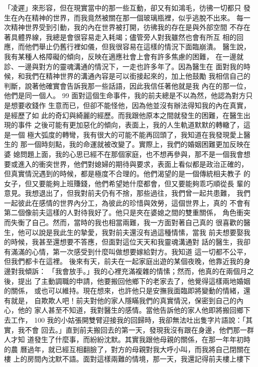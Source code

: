 「凌遲」來形容，但在現實當中的那一些互動，卻又有如鴻毛，彷彿一切都只
發生在內在精神的世界，而我竟然被關在那一個玻璃瓶裡，似乎逃脫不出來。
每一次精神世界受到引動，我的內在世界被打開，彷彿我的存在是與外部空間
不存在著具體界線，我總是會很容易走入耗竭；儘管旁人對我雖然也會有所互
相的回應，而他們舉止仍舊行裡如儀，但我很容易在這樣的情況下面臨崩潰。
醫生說，我有某種人格障礙的傾向，反映在適應社會上會有許多焦慮的困難，
在一邊就診、一邊與對方的靈魂溝通的情況下，一走也許多年了。因為醫生在
面對我的時候，和我們在精神世界的溝通內容是可以銜接起來的，加上他鼓勵
我相信自己的判斷，說著他確實會告訴我那一些話語，因此我信任著他就是我
內在的那一位，他們是同一個人。 
99 
面對這個生命事件，我的前夫總是不以為然，他認為對方只是想要收錢作
生意而已，但卻不能怪他，因為他並沒有辦法得知我的內在真實，是經歷了如
此的奇幻與綺麗的經歷。而我跟他原本之間就發生的困難，在醫生出現的事件
之後可能有更加惡化的傾向，表面上，我的人生軌道默默的轉轍了，這是一個
極大弧度的轉彎，我有很大的可能不能再回頭了，我知道在我發現愛上醫生的
那一個時刻點，我的命運就被改變了。實際上，我們的婚姻困難更加反映在婆
媳問題上面，我的心思已經不在那個家庭，也不想再參與，那不是一個我會想
要或進入的衝突世界，他們對媳婦的期待與要求，表面上看似都是政治正確的，
但真實情況遇到的時候，都是極度不合理的。他們渴望的是一個傳統相夫教子
的女子，但又要能夠上班賺錢，他們希望她什麼都會，但又要能夠乖巧順從長
輩的意見。我想退出了，但我對前夫仍有不捨，那些過往，我們曾一起共患難，
我們一起彼此在感情的世界內分工，為彼此的珍惜與效勞，這個世界上，真的
不會有第二個像前夫這樣的人對待我好了。他只是夾在婆媳之間的雙重關係，
角色衝突而失衡了自己。然而，當時的我也相當兩難，我一方面對著自己真的
很喜歡的醫生，他可以說是我此生的摯愛，我對前夫還沒有過這種情愫，當我
前夫想要娶我的時候，我甚至還想要不答應，但面對這位天天和我靈魂溝通對
話的醫生，我卻有滿滿的心情，第一次感受到什麼叫做想要嫁給對方。我知道
這一切都不公平，但我們都卡在這裡。  
後來有天，前夫在一起家庭出遊的某個夜晚，他靠近我的身邊對我傾訴：
「我會放手。」我的心裡充滿複雜的情愫；然而，他真的在兩個月之後，提出
了主動調職的申請，他要搬回他鄉下的老家去了，他覺得這樣兩地婚姻的關係，
或也可以維持。現在想來，也許他只是安撫我面臨即將變動的情緒，還有就是，
自欺欺人吧！前夫對他的家人隱瞞我們的真實情況，保密到自己的內心，他的
家人甚至不知道，我對醫生的感情。當他告訴他的家人他即將搬回鄉下去工作，
100 
我的小姑張開雙臂迎接我的回歸時，我卻無法吐出隻字片語說：「其實，我不會
回去。」直到前夫搬回去的第一天，發現我沒有跟在身邊，他們那一群人才知
道發生了什麼事，而紛紛沈默。其實我跟他母親的關係，在那一年年初時的農
曆過年，就已經互相翻臉了，對方的母親對我大呼小叫，而我將自己閉關在樓
上的房間內沈默不語。面對這樣兩難的情境，那一天，我還記得前夫樓上樓下
